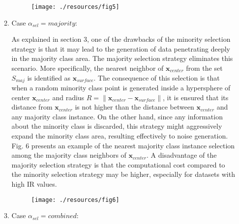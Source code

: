 \documentclass[parskip=full]{scrartcl}
\begin{document}
\begin{enumerate}
\begin{enumerate}
	\begin{figure}[H]
		\centering
		\texttt{[image: ./resources/fig5]}
	\end{figure}

	\item Case \( \alpha_{sel} = majority \):

	As explained in section 3, one of the drawbacks of the minority selection
	strategy is that it may lead to the generation of data penetrating deeply in
	the majority class area. The majority selection strategy eliminates this
	scenario. More specifically, the nearest neighbor of \( \textbf{x}_{center}
	\) from the set \( S_{maj} \) is identified as \( \textbf{x}_{surface} \).
	The consequence of this selection is that when a random minority class point
	is generated inside a hypersphere of center \( \textbf{x}_{center} \) and
	radius \( R = \| \textbf{x}_{center} - \textbf{x}_{surface} \| \), it is
	ensured that its distance from \( \textbf{x}_{center} \) is not higher than
	the distance between \( \textbf{x}_{center} \) and any majority class
	instance. On the other hand, since any information about the minority class
	is discarded, this strategy might aggressively expand the minority class
	area, resulting effectively to noise generation. Fig. 6 presents an example
	of the nearest majority class instance selection among the majority class
	neighbors of \( \textbf{x}_{center} \). A disadvantage of the majority
	selection strategy is that the computational cost compared to the minority
	selection strategy may be higher, especially for datasets with high IR
	values.

	\begin{figure}[H]
		\centering
		\texttt{[image: ./resources/fig6]}
	\end{figure}

	\item Case \( \alpha_{sel} = combined \):


\end{enumerate}
\end{enumerate}
\end{document}
